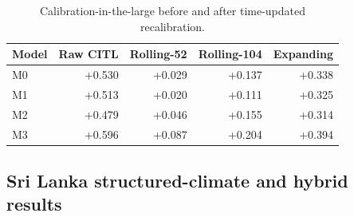 \documentclass[11pt,a4paper]{article}
\begin{document}
\begin{table}[htbp]
\centering
\caption{Calibration-in-the-large before and after time-updated recalibration.}
\label{tab:recal}
\small
\begin{tabular}{lrrrr}
\toprule
Model & Raw CITL & Rolling-52 & Rolling-104 & Expanding \\
\midrule
M0 & +0.530 & +0.029 & +0.137 & +0.338 \\
M1 & +0.513 & +0.020 & +0.111 & +0.325 \\
M2 & +0.479 & +0.046 & +0.155 & +0.314 \\
M3 & +0.596 & +0.087 & +0.204 & +0.394 \\
\bottomrule
\end{tabular}
\end{table}

\subsection{Sri Lanka structured-climate and hybrid results}
\end{document}
